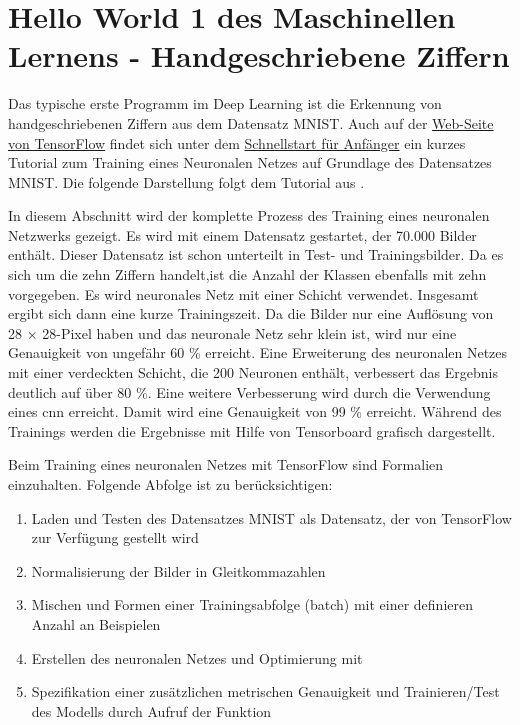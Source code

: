 \section{\glqq Hello World 1\grqq {}  des Maschinellen Lernens - Handgeschriebene Ziffern}

Das typische erste Programm im Deep Learning ist die Erkennung von handgeschriebenen Ziffern aus dem Datensatz MNIST. Auch auf der \href{https://www.tensorflow.org/}{Web-Seite von TensorFlow} findet sich unter dem 
\href{https://www.tensorflow.org/tutorials/quickstart/beginner}{Schnellstart für Anfänger} 
ein kurzes Tutorial zum Training eines Neuronalen Netzes auf Grundlage des Datensatzes MNIST. 
Die folgende Darstellung folgt dem Tutorial aus \cite{Heise:2020}.

\bigskip
 
In diesem Abschnitt wird der komplette Prozess des Training eines neuronalen Netzwerks gezeigt. Es wird mit einem Datensatz gestartet, der 70.000 Bilder enthält. Dieser Datensatz ist schon unterteilt in Test- und Trainingsbilder. Da es sich um die zehn Ziffern handelt,ist die Anzahl der Klassen ebenfalls mit zehn vorgegeben. Es wird neuronales Netz mit einer Schicht verwendet. Insgesamt ergibt sich dann eine kurze Trainingszeit. Da die Bilder nur eine Auflösung von 28 $\times$ 28-Pixel haben und das neuronale Netz sehr klein ist, wird nur eine Genauigkeit von ungefähr 60 \% erreicht. Eine Erweiterung des neuronalen Netzes mit einer verdeckten Schicht, die 200 Neuronen enthält, verbessert das Ergebnis deutlich auf über 80 \%.  Eine weitere Verbesserung wird durch die Verwendung eines \ac{cnn} erreicht. Damit wird eine Genauigkeit von 99 \% erreicht. Während des Trainings werden die Ergebnisse mit Hilfe von Tensorboard grafisch dargestellt.

\bigskip

Beim Training eines neuronalen Netzes mit TensorFlow sind Formalien einzuhalten. Folgende Abfolge ist zu berücksichtigen:



\begin{enumerate}
  \item Laden und Testen des Datensatzes MNIST als Datensatz, der von TensorFlow zur Verfügung gestellt wird
  \item Normalisierung der Bilder in Gleitkommazahlen
  \item Mischen und Formen einer Trainingsabfolge (batch) mit einer definieren Anzahl an Beispielen
  \item Erstellen des neuronalen Netzes und Optimierung mit 
  \item Spezifikation einer zusätzlichen metrischen Genauigkeit und 
        Trainieren/Test des Modells durch Aufruf der Funktion 
\end{enumerate}


